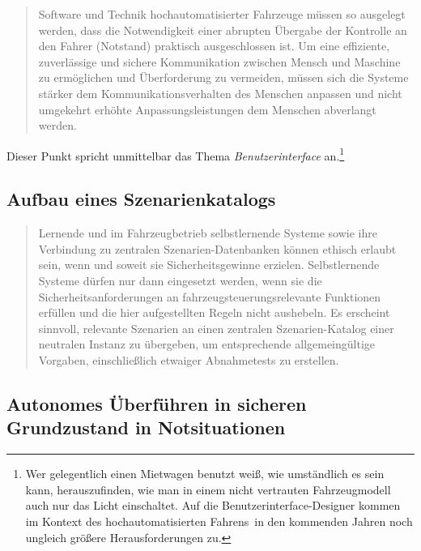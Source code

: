 \documentclass[twoside,a4paper,12pt]{article}
\begin{document}
\begin{quote}
\glqq
Software und Technik hochautomatisierter Fahrzeuge müssen so ausgelegt werden, dass
die Notwendigkeit einer abrupten Übergabe der Kontrolle an den Fahrer (\glqq Notstand\grqq)
praktisch ausgeschlossen ist. Um eine effiziente, zuverlässige und sichere Kommunikation zwischen Mensch und Maschine zu 
ermöglichen und Überforderung zu vermeiden,
müssen sich die Systeme stärker dem Kommunikationsverhalten des Menschen anpassen
und nicht umgekehrt erhöhte Anpassungsleistungen dem Menschen abverlangt werden.\grqq\mbox{~\cite[S. 13]{ek}}
\end{quote}

Dieser Punkt spricht unmittelbar das Thema \textit{Benutzerinterface} an.\footnote{Wer gelegentlich einen Mietwagen benutzt weiß, wie 
umständlich es sein kann, herauszufinden, wie man in einem nicht vertrauten Fahrzeugmodell auch nur das Licht einschaltet. Auf die
Benutzerinterface-Designer kommen im Kontext des \glqq hochautomatisierten Fahrens\grqq\ in den kommenden Jahren noch ungleich größere
Herausforderungen zu.}

\subsection{Aufbau eines Szenarienkatalogs} \label{AufbauEinesSzenarienkatalogs}

\begin{quote}
\glqq
Lernende und im Fahrzeugbetrieb selbstlernende Systeme sowie ihre Verbindung zu zentralen Szenarien-Datenbanken 
können ethisch erlaubt sein, wenn und soweit sie Sicherheitsgewinne erzielen. Selbstlernende Systeme dürfen nur dann eingesetzt werden, wenn
sie die Sicherheitsanforderungen an fahrzeugsteuerungsrelevante Funktionen erfüllen
und die hier aufgestellten Regeln nicht aushebeln. Es erscheint sinnvoll, relevante Szenarien an einen zentralen 
Szenarien-Katalog einer neutralen Instanz zu übergeben, um
entsprechende allgemeingültige Vorgaben, einschließlich etwaiger Abnahmetests zu erstellen.\grqq\mbox{~\cite[S. 13]{ek}}
\end{quote}



\subsection{Autonomes Überführen in sicheren Grundzustand in Notsituationen} \label{AutonomesUeberfuehrenInSicherenGrundzustandInNotsituationen}
\end{document}
